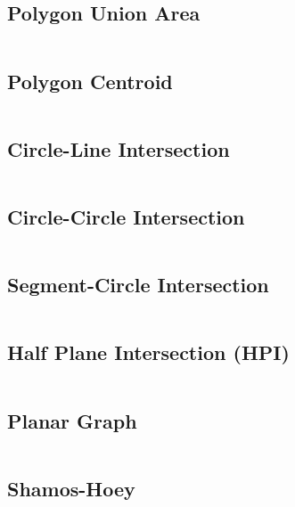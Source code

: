 \documentclass[8pt, a4paper, oneside]{extarticle}
\begin{document}
\begin{multicols*}{2}

\subsection{Polygon Union Area}
\inputminted{c++}{codes/geometry/polygon_union_area.cpp}

\subsection{Polygon Centroid}
\inputminted{c++}{codes/geometry/polygon_centroid.cpp}

\subsection{Circle-Line Intersection}
\inputminted{c++}{codes/geometry/circle_line_intersect.cpp}

\subsection{Circle-Circle Intersection}
\inputminted{c++}{codes/geometry/circle_circle_intersect.cpp}

\subsection{Segment-Circle Intersection}
\inputminted{c++}{codes/geometry/segment_circle_intersect.cpp}

\subsection{Half Plane Intersection (HPI)}
\inputminted{c++}{codes/geometry/hpi.cpp}

\subsection{Planar Graph}
\inputminted{c++}{codes/geometry/planar_graph.cpp}

\subsection{Shamos-Hoey}
\inputminted{c++}{codes/geometry/shamos_hoey.cpp}


\end{multicols*}
\end{document}
